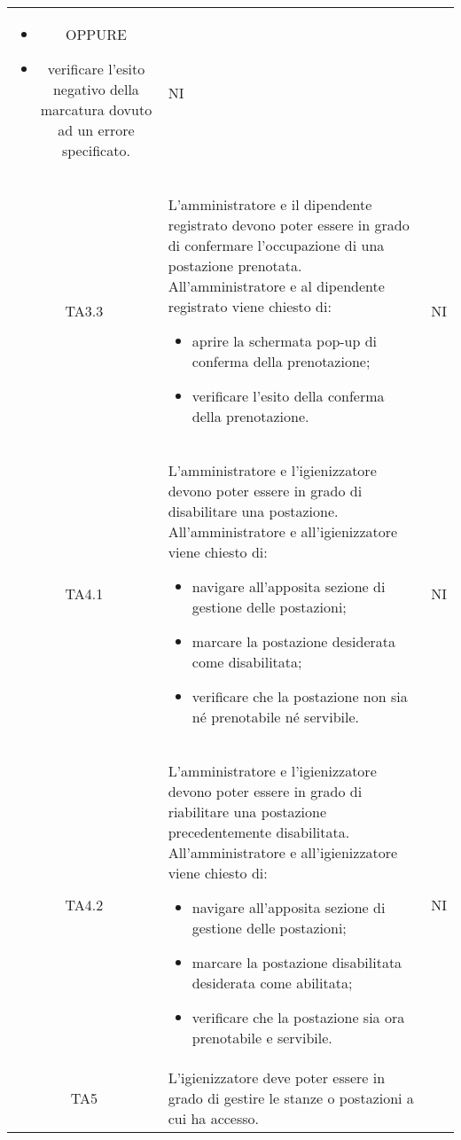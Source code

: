 {\begin{longtable}{ c C{11cm} c }
\begin{itemize}
            \item [] OPPURE
            \item verificare l'esito negativo della marcatura dovuto ad un errore specificato.
        \end{itemize}&
        NI\\
        TA3.3&
        L'amministratore e il dipendente registrato devono poter essere in grado di confermare l'occupazione di una postazione prenotata.\newline
        All'amministratore e al dipendente registrato viene chiesto di:
        \begin{itemize}
            \item aprire la schermata pop-up di conferma della prenotazione;
            \item verificare l'esito della conferma della prenotazione.
        \end{itemize}&
        NI\\
        TA4.1&
        L'amministratore e l'igienizzatore devono poter essere in grado di disabilitare una postazione.\newline
        All'amministratore e all'igienizzatore viene chiesto di:
        \begin{itemize}
            \item navigare all'apposita sezione di gestione delle postazioni;
            \item marcare la postazione desiderata come disabilitata;
            \item verificare che la postazione non sia né prenotabile né servibile.
        \end{itemize}&
        NI\\
        TA4.2&
        L'amministratore e l'igienizzatore devono poter essere in grado di riabilitare una postazione precedentemente disabilitata.\newline
        All'amministratore e all'igienizzatore viene chiesto di:
        \begin{itemize}
            \item navigare all'apposita sezione di gestione delle postazioni;
            \item marcare la postazione disabilitata desiderata come abilitata;
            \item verificare che la postazione sia ora prenotabile e servibile.
        \end{itemize}&
        NI\\
        TA5&
        L'igienizzatore deve poter essere in grado di gestire le stanze o postazioni a cui ha accesso.\newline

\end{longtable}}
